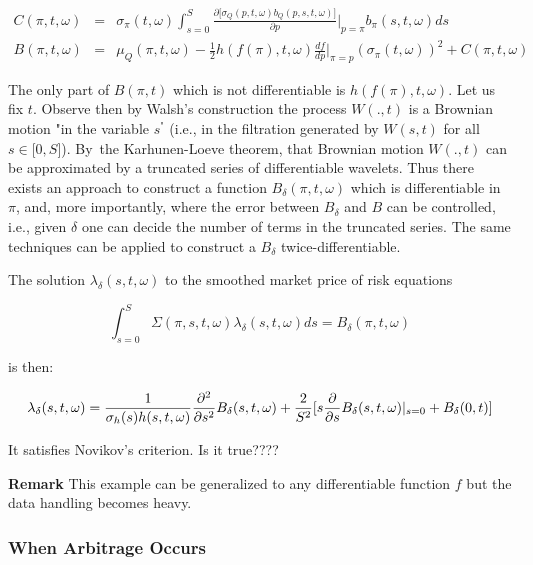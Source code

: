 \documentclass{article}
\begin{document}
\begin{eqnarray*}
C(\pi ,t,\omega ) &=&\sigma _{\pi }(t,\omega )\int_{s=0}^{S}\frac{\partial
\lbrack \sigma _{Q}(p,t,\omega )b_{Q}(p,s,t,\omega )]}{\partial p}|_{p=\pi
}b_{\pi }(s,t,\omega )ds \\
B(\pi ,t,\omega ) &=&\mu _{Q}(\pi ,t,\omega )-\frac{1}{2}h(f(\pi ),t,\omega )%
\frac{df}{dp}|_{\pi =p}(\sigma _{\pi }(t,\omega ))^{2}+C(\pi ,t,\omega )
\end{eqnarray*}

The only part of $B(\pi ,t)$ which is not differentiable is $h(f(\pi
),t,\omega )$. Let us fix $t$. Observe then by Walsh's construction the
process $W(.,t)$ is a Brownian motion "in the variable $s^{\text{"}}$ (i.e.,
in the filtration generated by $W(s,t)$ for all $s\in \lbrack 0,S]$). By\
the Karhunen-Loeve theorem, that Brownian motion $W(.,t)$ can be
approximated by a truncated series of differentiable wavelets. Thus there
exists an approach to construct a function $B_{\delta }(\pi ,t,\omega )$
which is differentiable in $\pi $, and, more importantly, where the error
between $B_{\delta }$ and $B$ can be controlled, i.e., given $\delta $ one
can decide the number of terms in the truncated series. The same techniques
can be applied to construct a $B_{\delta }$ twice-differentiable.

The solution $\lambda _{\delta }(s,t,\omega )$ to the smoothed market price
of risk equations

\begin{equation*}
\int_{s=0}^{S}\Sigma (\pi ,s,t,\omega )\lambda _{\delta }(s,t,\omega
)ds=B_{\delta }(\pi ,t,\omega )
\end{equation*}%
\bigskip

is then:

\begin{equation*}
\lambda _{\delta }(s,t,\omega )=\frac{1}{\sigma _{h}(s)h(s,t,\omega )}\frac{%
\partial ^{2}}{\partial s^{2}}B_{\delta }(s,t,\omega )+\frac{2}{S^{2}}[s%
\frac{\partial }{\partial s}B_{\delta }(s,t,\omega )|_{s=0}+B_{\delta }(0,t)]
\end{equation*}

It satisfies Novikov's criterion. Is it true????

\bigskip

\textbf{Remark} This example can be generalized to any differentiable
function $f$ but the data handling becomes heavy.

\bigskip \pagebreak

\subsubsection{When Arbitrage Occurs}
\end{document}
